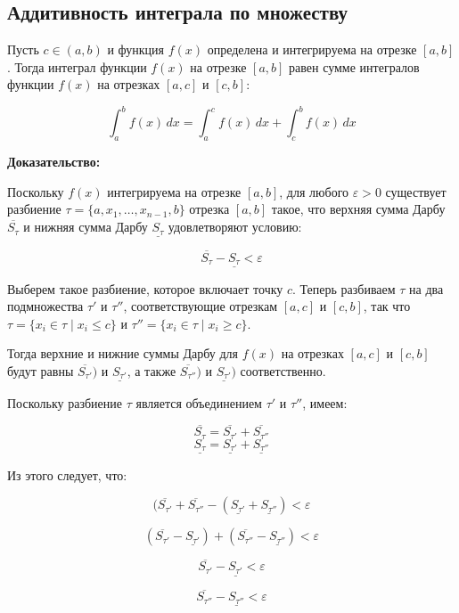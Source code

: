\documentclass[a4paper]{article}
\begin{document}
\begin{definit}
\subsection*{Аддитивность интеграла по множеству}


Пусть $c \in (a, b)$ и функция $f(x)$ определена и интегрируема на отрезке $[a, b]$. Тогда интеграл функции $f(x)$ на отрезке $[a, b]$ равен сумме интегралов функции $f(x)$ на отрезках $[a, c]$ и $[c, b]$:

\[
\int_{a}^{b} f(x) \, dx = \int_{a}^{c} f(x) \, dx + \int_{c}^{b} f(x) \, dx
\]

\textbf{Доказательство:}

Поскольку $f(x)$ интегрируема на отрезке $[a, b]$, для любого $\varepsilon > 0$ существует разбиение $\tau = \{a, x_1, \dots, x_{n-1}, b\}$ отрезка $[a, b]$ такое, что верхняя сумма Дарбу $\overline{S_\tau}$ и нижняя сумма Дарбу $\underline{S_\tau}$ удовлетворяют условию:

\[
\overline{S_\tau} - \underline{S_\tau} < \varepsilon
\]

Выберем такое разбиение, которое включает точку $c$. Теперь разбиваем $\tau$ на два подмножества $\tau'$ и $\tau''$, соответствующие отрезкам $[a, c]$ и $[c, b]$, так что $\tau = \{x_i \in \tau \mid x_i \leq c\}$ и $\tau'' = \{x_i \in \tau \mid x_i \geq c\}$.

Тогда верхние и нижние суммы Дарбу для $f(x)$ на отрезках $[a, c]$ и $[c, b]$ будут равны $\overline{S_{\tau'}})$ и $\underline{S_{\tau'}}$, а также $\overline{S_{\tau''}})$ и $\underline{S_{\tau'}})$ соответственно.

Поскольку разбиение $\tau$ является объединением $\tau'$ и $\tau''$, имеем:

\[
\overline{S_{\tau}} = \overline{S_{\tau'}} + \overline{S_{\tau''}}
\]
\[
\underline{S_{\tau}} = \underline{S_{\tau'}} + \underline{S_{\tau''}}
\]

Из этого следует, что:

\[
(\overline{S_{\tau'}} + \overline{S_{\tau''}} - (\underline{S_{\tau'}} + \underline{S_{\tau''}}) < \varepsilon
\]

\[
(\overline{S_{\tau'}} - \underline{S_{\tau'}}) + (\overline{S_{\tau''}} - \underline{S_{\tau''}}) < \varepsilon
\]

\[
\overline{S_{\tau'}} - \underline{S_{\tau'}} < \varepsilon
\]

\[
\overline{S_{\tau''}} - \underline{S_{\tau''}} < \varepsilon
\]




\end{definit}
\end{document}
